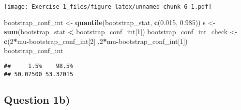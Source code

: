 \documentclass[
]{article}
\newenvironment{Shaded}{\begin{snugshade}}{\end{snugshade}}
\newcommand{\AttributeTok}[1]{\textcolor[rgb]{0.13,0.29,0.53}{#1}}
\newcommand{\CommentTok}[1]{\textcolor[rgb]{0.56,0.35,0.01}{\textit{#1}}}
\newcommand{\ConstantTok}[1]{\textcolor[rgb]{0.56,0.35,0.01}{#1}}
\newcommand{\ControlFlowTok}[1]{\textcolor[rgb]{0.13,0.29,0.53}{\textbf{#1}}}
\newcommand{\DecValTok}[1]{\textcolor[rgb]{0.00,0.00,0.81}{#1}}
\newcommand{\FloatTok}[1]{\textcolor[rgb]{0.00,0.00,0.81}{#1}}
\newcommand{\FunctionTok}[1]{\textcolor[rgb]{0.13,0.29,0.53}{\textbf{#1}}}
\newcommand{\NormalTok}[1]{#1}
\newcommand{\OtherTok}[1]{\textcolor[rgb]{0.56,0.35,0.01}{#1}}
\newcommand{\SpecialCharTok}[1]{\textcolor[rgb]{0.81,0.36,0.00}{\textbf{#1}}}
\begin{document}
\begin{Shaded}
\end{Shaded}

\texttt{[image: Exercise-1\_files/figure-latex/unnamed-chunk-6-1.pdf]}

\begin{Shaded}
\begin{Highlighting}[]
\NormalTok{bootstrap\_conf\_int }\OtherTok{\textless{}{-}} \FunctionTok{quantile}\NormalTok{(bootstrap\_stat, }\FunctionTok{c}\NormalTok{(}\FloatTok{0.015}\NormalTok{, }\FloatTok{0.985}\NormalTok{))}
\NormalTok{s }\OtherTok{\textless{}{-}} \FunctionTok{sum}\NormalTok{(bootstrap\_stat }\SpecialCharTok{\textless{}}\NormalTok{ bootstrap\_conf\_int[}\DecValTok{1}\NormalTok{])}
\NormalTok{bootstrap\_conf\_int\_check }\OtherTok{\textless{}{-}} \FunctionTok{c}\NormalTok{(}\DecValTok{2}\SpecialCharTok{*}\NormalTok{mu}\SpecialCharTok{{-}}\NormalTok{bootstrap\_conf\_int[}\DecValTok{2}\NormalTok{] ,}\DecValTok{2}\SpecialCharTok{*}\NormalTok{mu}\SpecialCharTok{{-}}\NormalTok{bootstrap\_conf\_int[}\DecValTok{1}\NormalTok{])}
\NormalTok{bootstrap\_conf\_int}
\end{Highlighting}
\end{Shaded}

\begin{verbatim}
##     1.5%    98.5% 
## 50.07500 53.37015
\end{verbatim}

\hypertarget{question-1b}{%
\subsection{Question 1b)}\label{question-1b}}
\end{document}
